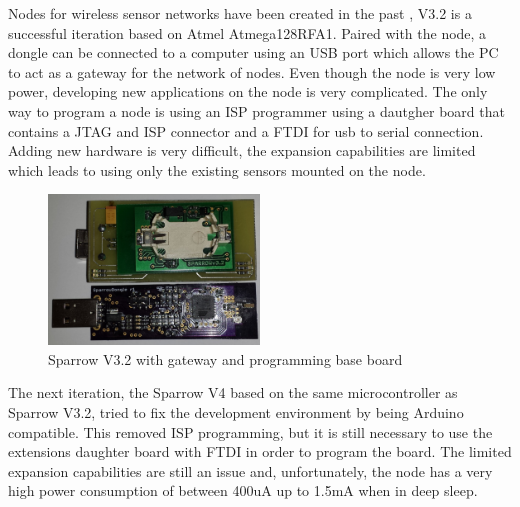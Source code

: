 Nodes for wireless sensor networks have been created in the past \cite{voinescu2013lightweight}, V3.2 is a successful
iteration based on Atmel Atmega128RFA1. Paired with the node, a dongle can be connected to a
computer using an USB port which allows the PC to act as a gateway for the network of nodes. Even
though the node is very low power, developing new applications on the node is very complicated. The
only way to program a node is using an ISP programmer using a dautgher board that contains a JTAG
and ISP connector and a FTDI for usb to serial connection. Adding new hardware is very difficult, the expansion
capabilities are limited which leads to using only the existing sensors mounted on the node.

\begin{figure}[ht] \centering
\includegraphics[width=0.5\textwidth]{img/sparrowv32.jpg}
\caption{Sparrow V3.2 with gateway and programming base board}
\end{figure}


The next iteration, the Sparrow V4 based on the same microcontroller as Sparrow V3.2, tried to fix
the development environment by being Arduino \cite{arduino}
compatible. This removed ISP programming, but it is still necessary to use the extensions daughter board
with FTDI in order to program the board. The limited expansion capabilities are still an issue and, unfortunately, the node
has a very high power consumption of between 400uA up to 1.5mA \cite{geo} when in deep sleep.


